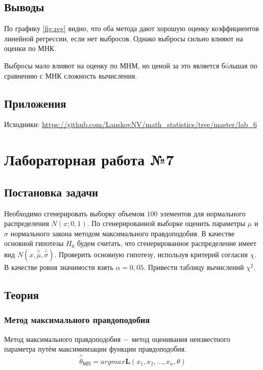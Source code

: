 \documentclass[12pt]{report}
\begin{document}
\section{Выводы}
По графику \ref{fig:reg} видно, что оба метода дают хорошую оценку коэффициентов линейной регрессии, если нет выбросов. Однако выбросы сильно влияют на оценки по МНК.

Выбросы мало влияют на оценку по МНМ, но ценой за это является б\'oльшая по сравнению с МНК сложность вычисления.

\section{Приложения}

Исходники: \url{https://github.com/LanskovNV/math_statistics/tree/master/lab_6}

\chapter{Лабораторная работа №7}
\section{Постановка задачи}

Необходимо сгенерировать выборку объемом $100$ элементов для нормального распределения $N(x;0,1).$ По сгенерированной выборке оценить параметры $\mu$ и $\sigma$ нормального закона методом максимального правдоподобия. В качестве основной гипотезы $H_0$ будем считать, что сгенерированное распределение имеет вид $N(x,\overset{\wedge}{\mu},\overset{\wedge}{\sigma} ).$ Проверить основную гипотезу, используя критерий согласия $\chi$. В качестве ровня значимости взять $\alpha=0,05.$ Привести таблицу вычислений $\chi^2.$


\section{Теория}
\subsection{Метод максимального правдоподобия}
Метод максимального правдоподобия $\--$ метод оценивания неизвестного параметра путём максимимзации функции правдоподобия.
\begin{equation}
    \overset{\wedge}{\theta}_{\text{МП}}=argmax \mathbf{L}(x_1,x_2,\ldots,x_n,\theta)
\end{equation}
\end{document}
